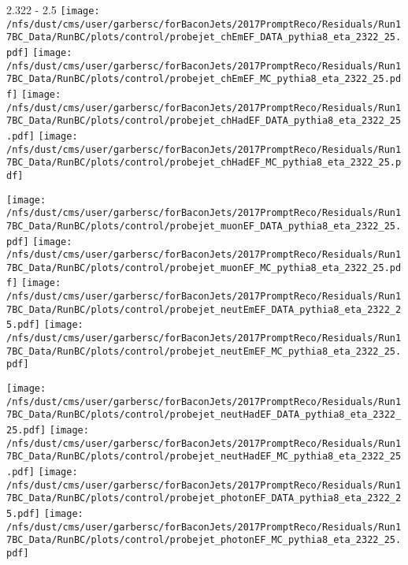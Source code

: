 \documentclass[t,compress]{beamer}
\begin{document}
\begin{frame}{2.322 - 2.5}
	\texttt{[image: /nfs/dust/cms/user/garbersc/forBaconJets/2017PromptReco/Residuals/Run17BC\_Data/RunBC/plots/control/probejet\_chEmEF\_DATA\_pythia8\_eta\_2322\_25.pdf]}
	\texttt{[image: /nfs/dust/cms/user/garbersc/forBaconJets/2017PromptReco/Residuals/Run17BC\_Data/RunBC/plots/control/probejet\_chEmEF\_MC\_pythia8\_eta\_2322\_25.pdf]}
	\texttt{[image: /nfs/dust/cms/user/garbersc/forBaconJets/2017PromptReco/Residuals/Run17BC\_Data/RunBC/plots/control/probejet\_chHadEF\_DATA\_pythia8\_eta\_2322\_25.pdf]}
	\texttt{[image: /nfs/dust/cms/user/garbersc/forBaconJets/2017PromptReco/Residuals/Run17BC\_Data/RunBC/plots/control/probejet\_chHadEF\_MC\_pythia8\_eta\_2322\_25.pdf]}
\newline

\vspace{-0.65cm}
	\texttt{[image: /nfs/dust/cms/user/garbersc/forBaconJets/2017PromptReco/Residuals/Run17BC\_Data/RunBC/plots/control/probejet\_muonEF\_DATA\_pythia8\_eta\_2322\_25.pdf]}
	\texttt{[image: /nfs/dust/cms/user/garbersc/forBaconJets/2017PromptReco/Residuals/Run17BC\_Data/RunBC/plots/control/probejet\_muonEF\_MC\_pythia8\_eta\_2322\_25.pdf]}
	\texttt{[image: /nfs/dust/cms/user/garbersc/forBaconJets/2017PromptReco/Residuals/Run17BC\_Data/RunBC/plots/control/probejet\_neutEmEF\_DATA\_pythia8\_eta\_2322\_25.pdf]}
	\texttt{[image: /nfs/dust/cms/user/garbersc/forBaconJets/2017PromptReco/Residuals/Run17BC\_Data/RunBC/plots/control/probejet\_neutEmEF\_MC\_pythia8\_eta\_2322\_25.pdf]}
\newline

\vspace{-0.65cm}
	\texttt{[image: /nfs/dust/cms/user/garbersc/forBaconJets/2017PromptReco/Residuals/Run17BC\_Data/RunBC/plots/control/probejet\_neutHadEF\_DATA\_pythia8\_eta\_2322\_25.pdf]}
	\texttt{[image: /nfs/dust/cms/user/garbersc/forBaconJets/2017PromptReco/Residuals/Run17BC\_Data/RunBC/plots/control/probejet\_neutHadEF\_MC\_pythia8\_eta\_2322\_25.pdf]}
	\texttt{[image: /nfs/dust/cms/user/garbersc/forBaconJets/2017PromptReco/Residuals/Run17BC\_Data/RunBC/plots/control/probejet\_photonEF\_DATA\_pythia8\_eta\_2322\_25.pdf]}
	\texttt{[image: /nfs/dust/cms/user/garbersc/forBaconJets/2017PromptReco/Residuals/Run17BC\_Data/RunBC/plots/control/probejet\_photonEF\_MC\_pythia8\_eta\_2322\_25.pdf]}
\end{frame}
\end{document}

